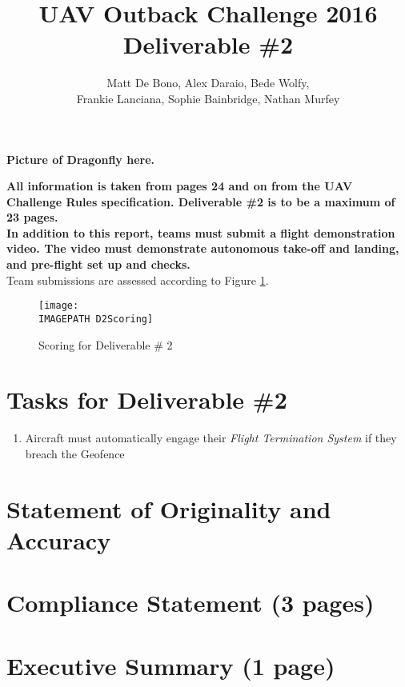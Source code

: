 \documentclass{article}
\title{UAV Outback Challenge 2016\\ \large Deliverable \#2\\}
\author{
	Matt De Bono,
	Alex Daraio,
	Bede Wolfy,\\
	Frankie Lanciana,
	Sophie Bainbridge,
	Nathan Murfey}
\newcommand{\IMAGEPATH}{../Images/}
\begin{document}
\maketitle

\textbf{Picture of Dragonfly here.}

\newpage

\textbf{All information is taken from pages 24 and on from the UAV Challenge Rules specification. Deliverable \#2 is to be a maximum of 23 pages.}\\

\textbf{In addition to this report, teams must submit a flight demonstration video. The video must demonstrate autonomous take-off and landing, and pre-flight set up and checks.}\\

Team submissions are assessed according to Figure \ref{fig:D2Scoring}.

\begin{figure}[h]
	\centering
	\texttt{[image: \\IMAGEPATH D2Scoring]}
	\caption{Scoring for Deliverable \# 2}
	\label{fig:D2Scoring}
\end{figure}

\section{Tasks for Deliverable \#2}
\begin{enumerate}
	\item Aircraft must automatically engage their \textit{Flight Termination System} if they breach the Geofence
\end{enumerate}

\tableofcontents

\newpage

\section{Statement of Originality and Accuracy}


\newpage

\section{Compliance Statement (3 pages)}


\section{Executive Summary (1 page)}

\end{document}
